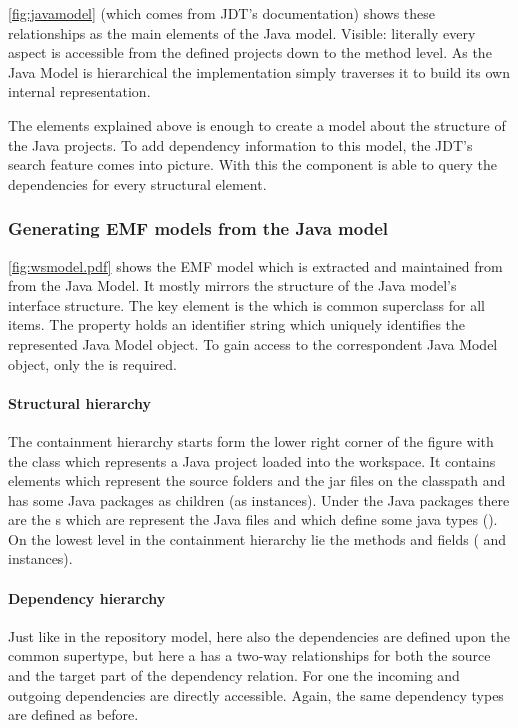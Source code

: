 \autoref{fig:javamodel} (which comes from JDT's documentation) shows these
relationships as the main elements of the Java model. Visible: literally every aspect 
is accessible from the defined projects down to the method level. As the Java Model 
is hierarchical the implementation simply traverses it to build its own internal representation. 

The elements explained above is enough to create a model about the structure of
the Java projects. To add dependency information to this model, the JDT's search
feature comes into picture. With this the component is able to query the dependencies
for every structural element. 

\subsubsection{Generating EMF models from the Java model}
\autoref{fig:wsmodel.pdf} shows the EMF model which is extracted and maintained
from from the Java Model. It mostly mirrors the structure of the Java model's
interface structure. The key element is the  which is common
superclass for all items. The  property holds an identifier string
which uniquely identifies the represented Java Model object. To gain access to
the correspondent Java Model object, only the  is
required.

\paragraph{Structural hierarchy}
The containment hierarchy starts form the lower right corner of the figure with
the  class which represents a Java project loaded into the
workspace. It contains  elements which represent the
source folders and the jar files on the classpath and has some Java packages as
children (as  instances). Under the Java packages there
are the s which are represent the Java files and which
define some java types (). On the lowest level in the containment
hierarchy lie the methods and fields ( and 
instances).

\paragraph{Dependency hierarchy}
Just like in the repository model, here also the dependencies are defined upon
the common supertype, but here a  has a two-way relationships
for both the source and the target part of the dependency relation. For one
 the incoming and outgoing dependencies are directly
accessible. Again, the same dependency types are defined as before.

